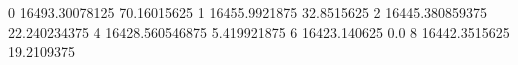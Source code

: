 0 16493.30078125 70.16015625
1 16455.9921875 32.8515625
2 16445.380859375 22.240234375
4 16428.560546875 5.419921875
6 16423.140625 0.0
8 16442.3515625 19.2109375
